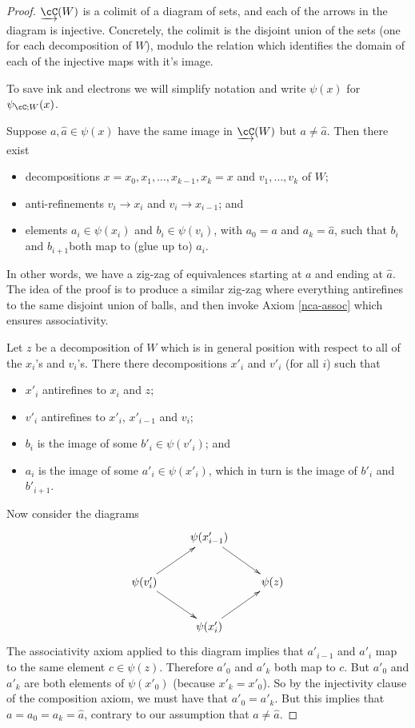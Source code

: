 \begin{proof}
$\cl{\cC}(W)$ is a colimit of a diagram of sets, and each of the arrows in the diagram is
injective.
Concretely, the colimit is the disjoint union of the sets (one for each decomposition of $W$),
modulo the relation which identifies the domain of each of the injective maps
with it's image.

To save ink and electrons we will simplify notation and write $\psi(x)$ for $\psi_{\cC;W}(x)$.

Suppose $a, \hat{a}\in \psi(x)$ have the same image in $\cl{\cC}(W)$ but $a\ne \hat{a}$.
Then there exist
\begin{itemize}
\item decompositions $x = x_0, x_1, \ldots , x_{k-1}, x_k = x$ and $v_1,\ldots, v_k$ of $W$;
\item anti-refinements $v_i\to x_i$ and $v_i\to x_{i-1}$; and
\item elements $a_i\in \psi(x_i)$ and $b_i\in \psi(v_i)$, with $a_0 = a$ and $a_k = \hat{a}$, 
such that $b_i$ and $b_{i+1}$both map to (glue up to) $a_i$.
\end{itemize}
In other words, we have a zig-zag of equivalences starting at $a$ and ending at $\hat{a}$.
The idea of the proof is to produce a similar zig-zag where everything antirefines to the same
disjoint union of balls, and then invoke Axiom \ref{nca-assoc} which ensures associativity.

Let $z$ be a decomposition of $W$ which is in general position with respect to all of the 
$x_i$'s and $v_i$'s.
There there decompositions $x'_i$ and $v'_i$ (for all $i$) such that
\begin{itemize}
\item $x'_i$ antirefines to $x_i$ and $z$;
\item $v'_i$ antirefines to $x'_i$, $x'_{i-1}$ and $v_i$;
\item $b_i$ is the image of some $b'_i\in \psi(v'_i)$; and
\item $a_i$ is the image of some $a'_i\in \psi(x'_i)$, which in turn is the image
of $b'_i$ and $b'_{i+1}$.
\end{itemize}
Now consider the diagrams
\[ \xymatrix{
	& \psi(x'_{i-1}) \ar[rd] & \\
	\psi(v'_i) \ar[ru] \ar[rd] & & \psi(z) \\
	& \psi(x'_i) \ar[ru] &
} \]
The associativity axiom applied to this diagram implies that $a'_{i-1}$ and $a'_i$
map to the same element $c\in \psi(z)$.
Therefore $a'_0$ and $a'_k$ both map to $c$.
But $a'_0$ and $a'_k$ are both elements of $\psi(x'_0)$ (because $x'_k = x'_0$).
So by the injectivity clause of the composition axiom, we must have that $a'_0 = a'_k$.
But this implies that $a = a_0 = a_k = \hat{a}$, contrary to our assumption that $a\ne \hat{a}$.
\end{proof}

